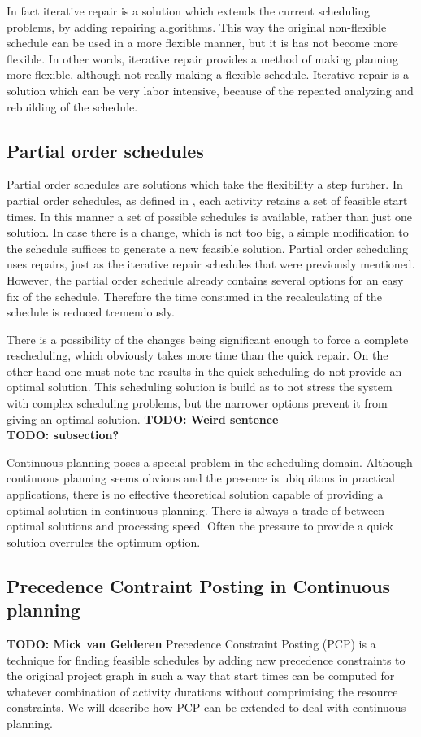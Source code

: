 \documentclass{article}
\newcommand{\TODO}[1]{{\color{red}\textbf{TODO: #1}}}
\begin{document}
In fact iterative repair is a solution which extends the current scheduling problems, by adding repairing algorithms.
This way the original non-flexible schedule can be used in a more flexible manner, but it is has not become more flexible.
In other words, iterative repair provides a method of making planning more flexible, although not really making a flexible schedule.
Iterative repair is a solution which can be very labor intensive, because of the repeated analyzing and rebuilding of the schedule.

\subsection{Partial order schedules}
Partial order schedules are solutions which take the flexibility a step further.
In partial order schedules, as defined in \cite{policella07}, each activity retains a set of feasible start times.
In this manner a set of possible schedules is available, rather than just one solution.
In case there is a change, which is not too big, a simple modification to the schedule suffices to generate a new feasible solution.
Partial order scheduling uses repairs, just as the iterative repair schedules that were previously mentioned.
However, the partial order schedule already contains several options for an easy fix of the schedule.
Therefore the time consumed in the recalculating of the schedule is reduced tremendously.

There is a possibility of the changes being significant enough to force a complete rescheduling, which obviously takes more time than the quick repair.
On the other hand one must note the results in the quick scheduling do not provide an optimal solution.
This scheduling solution is build as to not stress the system with complex scheduling problems, but the narrower options prevent it from giving an optimal solution. \TODO{Weird sentence} \\

\TODO{ subsection?}

Continuous planning poses a special problem in the scheduling domain.
Although continuous planning seems obvious and the presence is ubiquitous in practical applications, there is no effective theoretical solution capable of providing a optimal solution in continuous planning.
There is always a trade-of between optimal solutions and processing speed.
Often the pressure to provide a quick solution overrules the optimum option.

\subsection{Precedence Contraint Posting in Continuous planning}
\TODO{Mick van Gelderen}
Precedence Constraint Posting (PCP) is a technique for finding feasible schedules by adding new precedence constraints to the original project graph in such a way that start times can be computed for whatever combination of activity durations without comprimising the resource constraints. We will describe how PCP can be extended to deal with continuous planning. 
\end{document}
